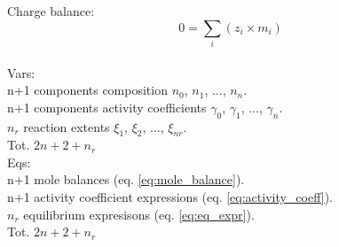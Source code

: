 \documentclass[onecolumn]{article}
\begin{document}
Charge balance:
\begin{equation}
0 = \sum_i(z_i \times m_i)
\end{equation}
\\
Vars: \\
n+1 components composition $n_0$, $n_1$, ..., $n_n$. \\
n+1 components activity coefficients $\gamma_0$, $\gamma_1$, ..., $\gamma_n$. \\
$n_r$ reaction extents $\xi_1$, $\xi_2$, ..., $\xi_{nr}$. \\
Tot. $2n + 2 + n_r$ \\
Eqs: \\
n+1 mole balances (eq. \ref{eq:mole_balance}). \\
n+1 activity coefficient expressions (eq. \ref{eq:activity_coeff}). \\
$n_r$ equilibrium expresisons (eq. \ref{eq:eq_expr}). \\
Tot. $2n + 2 + n_r$
\end{document}
